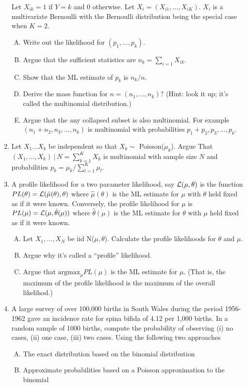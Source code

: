 \documentclass[12pt]{article}
\begin{document}
\begin{enumerate}[1.]
	Let $X_{ik} = 1$ if $Y = k$ and $0$ otherwise. 
	Let $X_i = (X_{i1}, \ldots, X_{iK})$. $X_i$ is a multivariate Bernoulli with the Bernoulli distribution being the special case when $K=2$. 
	\begin{enumerate}[A.]
	\item Write out the likelihood for $(p_1, \ldots, p_k)$.
	\item Argue that the sufficient statistics are $n_k = \sum_{i=1} X_{ik}$. 
	\item Show that the ML estimate of $p_k$ is $n_k / n$. 
	\item Derive the mass function for $n = (n_1,\ldots, n_k)$? 
	(Hint: look it up; it's called the multinomial distribution.) 
	\item Argue that the any collapsed subset is also multinomial. For example
		$(n_1 + n_2, n_3, \ldots, n_k)$ is multinomial with probabilities $p_1 + p_2, p_3, \ldots, p_k$.
	\end{enumerate}
\item Let $X_1\ldots X_k$ be independent so that $X_k\sim$ Poisson($\mu_k$). Argue
	That $(X_1, \ldots, X_k) ~|~ N = \sum_{k=1}^K X_k$ is multinomial with sample size
	$N$ and probabilities $p_k = \mu_k / \sum_{l=1}^K \mu_l$.
\item A profile likelihood for a two parameter likelihood, say ${\cal L}(\mu, \theta)$
is the function $PL(\theta) = {\cal L}(\hat\mu(\theta), \theta)$ where $\hat \mu(\theta)$ is the
ML estimate for $\mu$ with $\theta$ held fixed as if it were known. Conversely, the
profile likelihood for $\mu$ is $PL(\mu) = {\cal L}(\mu, \hat \theta (\mu))$ where $\hat \theta (\mu)$
is the ML estimate for $\theta$ with $\mu$ held fixed as if it were known.
\begin{enumerate}[A.]
\item Let $X_1,\ldots, X_N$ be iid N($\mu, \theta$). Calculate the profile likelihoods for $\theta$
and $\mu$.
\item Argue why it's called a ``profile'' likelihood.
\item Argue that $\mbox{argmax}_\mu PL(\mu)$ is the ML estimate for $\mu$. (That is, the maximum of the profile likelihood is the maximum of the overall likelihod.)
\end{enumerate}
\item A large survey of over 100,000 births in South Wales during the period
1956-1962 gave an incidence rate for spina bifida of 4.12 per
1,000 births.  In a random sample of 1000 births, compute the
probability of observing (i) no cases, (ii) one case, (iii) two
cases.  Using the following two approaches
\begin{enumerate}[A.]
\item The exact distribution based on the binomial distribution
\item Approximate probabilities based on a Poisson approximation to the binomial
\end{enumerate}
\end{enumerate}
\end{document}
